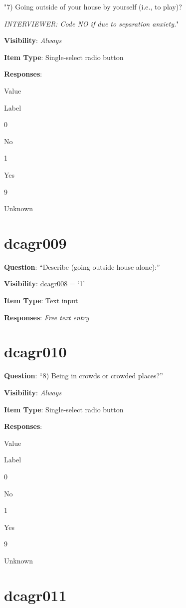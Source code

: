 \documentclass[]{book}
\begin{document}
"7) Going outside of your house by yourself (i.e., to play)?

\emph{INTERVIEWER: Code NO if due to separation anxiety.}"

\textbf{Visibility}: \emph{Always}

\textbf{Item Type}: Single-select radio button

\textbf{Responses}:

Value

Label

0

No

1

Yes

9

Unknown

\hypertarget{dcagr009}{%
\section{dcagr009}\label{dcagr009}}

\textbf{Question}: ``Describe (going outside house alone):''

\textbf{Visibility}: \protect\hyperlink{dcagr008}{dcagr008} = `1'

\textbf{Item Type}: Text input

\textbf{Responses}: \emph{Free text entry}

\hypertarget{dcagr010}{%
\section{dcagr010}\label{dcagr010}}

\textbf{Question}: ``8) Being in crowds or crowded places?''

\textbf{Visibility}: \emph{Always}

\textbf{Item Type}: Single-select radio button

\textbf{Responses}:

Value

Label

0

No

1

Yes

9

Unknown

\hypertarget{dcagr011}{%
\section{dcagr011}\label{dcagr011}}
\end{document}
